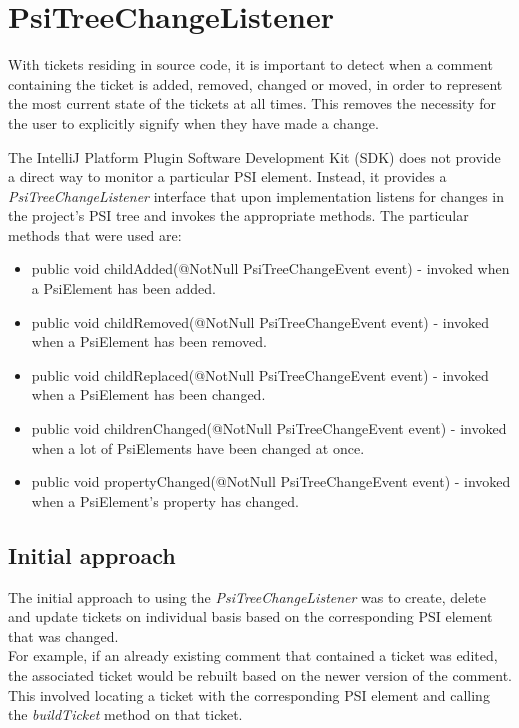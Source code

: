 \documentclass{4thYearProject}
\begin{document}
\section{PsiTreeChangeListener}

With tickets residing in source code, it is important to detect when a comment containing the ticket is added, removed, changed or moved, in order to represent the most current state of the tickets at all times. This removes the necessity for the user to explicitly signify when they have made a change.

The IntelliJ Platform Plugin Software Development Kit (SDK) does not provide a direct way to monitor a particular PSI element. Instead, it provides a \textit{PsiTreeChangeListener} interface that upon implementation listens for changes in the project's PSI tree and invokes the appropriate methods. The particular methods that were used are:

\begin{itemize}
\item public void childAdded(@NotNull PsiTreeChangeEvent event) - invoked when a PsiElement has been added.
\item public void childRemoved(@NotNull PsiTreeChangeEvent event) - invoked when a PsiElement has been removed.
\item public void childReplaced(@NotNull PsiTreeChangeEvent event) - invoked when a PsiElement has been changed.
\item public void childrenChanged(@NotNull PsiTreeChangeEvent event) - invoked when a lot of PsiElements have been changed at once.
\item public void propertyChanged(@NotNull PsiTreeChangeEvent event) - invoked when a PsiElement's property has changed.

\end{itemize}

\subsection{Initial approach}

The initial approach to using the \textit{PsiTreeChangeListener} was to create, delete and update tickets on individual basis based on the corresponding PSI element that was changed. \\
For example, if an already existing comment that contained a ticket was edited, the associated ticket would be rebuilt based on the newer version of the comment. This involved locating a ticket with the corresponding PSI element and calling the \textit{buildTicket} method on that ticket.  
\end{document}
